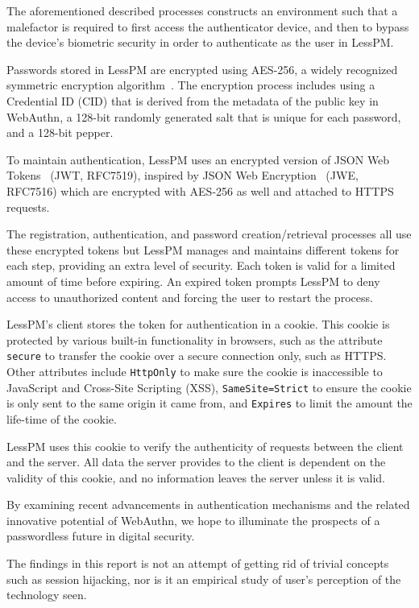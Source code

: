 The aforementioned described processes constructs an environment such that a
malefactor is required to first access the authenticator device, and then
to bypass the device's biometric security in order to authenticate as the user
in LessPM\@.

Passwords stored in LessPM are encrypted using AES-256, a widely recognized
symmetric encryption algorithm~\cite{schneier2000secrets,rijndael_book}.
The encryption process includes using a Credential ID (CID) that is derived from
the metadata of the public key in WebAuthn, a 128-bit randomly generated salt
that is unique for each password, and a 128-bit pepper.

To maintain authentication, LessPM uses an encrypted version of JSON Web
Tokens~\cite{RFC7519} (JWT, RFC7519), inspired by JSON Web
Encryption~\cite{rfc7516} (JWE, RFC7516) which are encrypted with AES-256 as
well and attached to HTTPS requests.

The registration, authentication, and password creation/retrieval processes
all use these encrypted tokens but LessPM manages and maintains different
tokens for each step, providing an extra level of security.
Each token is valid for a limited amount of time before expiring.
An expired token prompts LessPM to deny access to unauthorized content and
forcing the user to restart the process.

LessPM's client stores the token for authentication in a cookie.
This cookie is protected by various built-in functionality in browsers, such as
the attribute \texttt{secure} to transfer the cookie over a secure connection
only, such as HTTPS\@.
Other attributes include \texttt{HttpOnly} to make sure the cookie is
inaccessible to JavaScript and Cross-Site Scripting (XSS),
\texttt{SameSite=Strict} to ensure the cookie is only sent to the same origin
it came from, and \texttt{Expires} to limit the amount the life-time of the
cookie.

LessPM uses this cookie to verify the authenticity of requests between the
client and the server.
All data the server provides to the client is dependent on the validity of
this cookie, and no information leaves the server unless it is valid.

By examining recent advancements in authentication mechanisms and the related
innovative potential of WebAuthn, we hope to illuminate the prospects of a
passwordless future in digital security.

The findings in this report is not an attempt of getting rid of trivial
concepts such as session hijacking, nor is it an empirical study of user's
perception of the technology seen.
